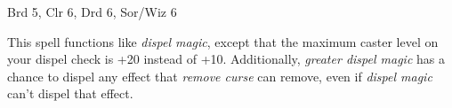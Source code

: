 
\begin{description*}
\item[Level:] Brd 5, Clr 6, Drd 6, Sor/Wiz 6
\end{description*}

This spell functions like \textit{dispel magic}, except that the maximum caster
level on your dispel check is +20 instead of +10.
Additionally, \textit{greater dispel magic} has a chance to dispel any effect that
\textit{remove curse} can remove, even if \textit{dispel magic} can't dispel that
effect.